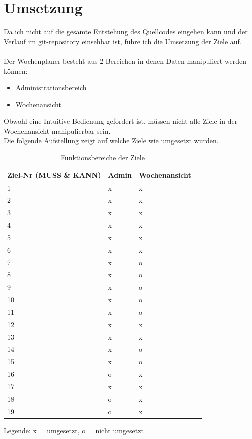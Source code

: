 \section{Umsetzung}
Da ich nicht auf die gesamte Entstehung des Quellcodes eingehen kann und der Verlauf im git-repository einsehbar ist,
führe ich die Umsetzung der Ziele auf.\\\\
Der Wochenplaner besteht aus 2 Bereichen in denen Daten manipuliert werden können:
\begin{itemize}
    \item Administrationsbereich
    \item Wochenansicht\\
\end{itemize}
Obwohl eine Intuitive Bedienung gefordert ist, müssen nicht alle Ziele in der Wochenansicht manipulierbar sein.\\
Die folgende Aufstellung zeigt auf welche Ziele wie umgesetzt wurden.\\

\begin{table}[!ht]
\begin{center}
    \begin{longtable}{llp{3cm}l}
        \toprule Ziel-Nr (MUSS \& KANN) & Admin & Wochenansicht \\
        \midrule 1 & x & x \\
        \midrule 2 & x & x \\
        \midrule 3 & x & x \\
        \midrule 4 & x & x \\
        \midrule 5 & x & x \\
        \midrule 6 & x & x \\ 
        \midrule 7 & x & o \\
        \midrule 8 & x & o \\
        \midrule 9 & x & o \\
        \midrule 10 & x & o \\
        \midrule 11 & x & o \\
        \midrule 12 & x & x \\
        \midrule 13 & x & x \\
        \midrule 14 & x & o \\
        \midrule 15 & x & o \\
        \midrule 16 & o & x \\
        \midrule 17 & x & x \\
        \midrule 18 & o & x \\
        \midrule 19 & o & x \\
        \bottomrule
        \end{longtable}
    \caption{Funktionsbereiche der Ziele}
    \label{tab:funktionsbereiche_ziele}
\end{center}
\end{table}
Legende: x = umgesetzt, o = nicht umgesetzt
